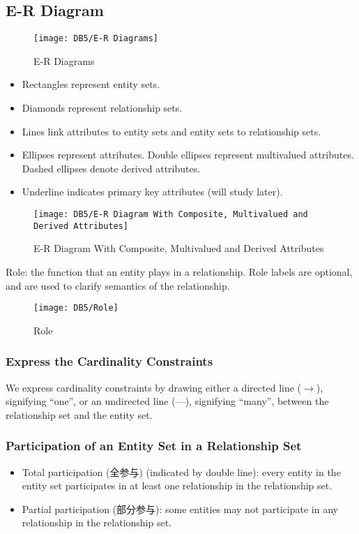 \subsection{E-R Diagram}

\begin{figure}[H]
    \centering
    \texttt{[image: DB5/E-R Diagrams]}
    \caption{E-R Diagrams}
\end{figure}

\begin{itemize}\small
    \item Rectangles represent entity sets.
    \item Diamonds represent relationship sets.
    \item Lines link attributes to entity sets and entity sets to relationship sets.
    \item Ellipses represent attributes.
    \subitem Double ellipses represent multivalued attributes.
    \subitem Dashed ellipses denote derived attributes.
    \item Underline indicates primary key attributes (will study later).
\end{itemize}

\begin{figure}[H]
    \centering
    \texttt{[image: DB5/E-R Diagram With Composite, Multivalued and Derived Attributes]}
    \caption{E-R Diagram With Composite, Multivalued and Derived Attributes}
\end{figure}

Role: the function that an entity plays in a relationship. Role labels are optional, and are used to clarify semantics of the relationship.

\begin{figure}[H]
    \centering
    \texttt{[image: DB5/Role]}
    \caption{Role}
\end{figure}

\subsubsection{Express the Cardinality Constraints}
We express cardinality constraints by drawing either a directed line ($\rightarrow$), signifying ``one'', or an undirected line (---), signifying ``many'', between the relationship set and the entity set.

\subsubsection{Participation of an Entity Set in a Relationship Set}
\begin{itemize}
    \item Total participation (全参与) (indicated by double line): every entity in the entity set participates in at least one relationship in the relationship set.
    \item Partial participation (部分参与): some entities may not participate in any relationship in the relationship set.
\end{itemize}

